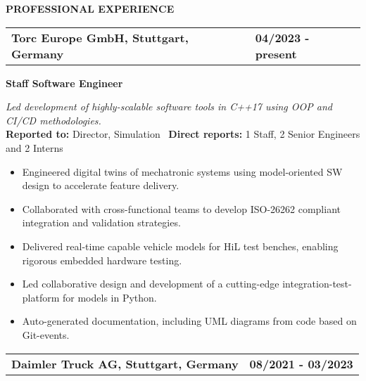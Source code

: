 \documentclass[a4paper,10pt]{article}
\begin{document}
\vspace{0.1cm}
\noindent{\rule{\linewidth}{1.4pt}}
\textbf{PROFESSIONAL EXPERIENCE}

\vspace{-0.1cm}
\noindent{\rule{\linewidth}{0.01cm}}

\noindent
\begin{tabular}{ @{\hskip 0pt}m{} >{\raggedleft\arraybackslash}p{} }
    \noindent\textbf{Torc Europe GmbH, Stuttgart, Germany} & \textbf{04/2023 - present}
\end{tabular}

\noindent
\colorbox{gray!40}{%
    \parbox{0.99\textwidth}{%
        \textcolor{highlightcolor}{\textbf{Staff Software Engineer}}
    }%
}

\vspace{0.2cm}
\noindent
\textit{Led development of highly-scalable software tools in C++17 using OOP and CI/CD methodologies.}\\

\vspace{-0.3cm}
\noindent
\textbf{Reported to:} Director, Simulation \, \textbf{Direct reports:} 1 Staff, 2 Senior Engineers and 2 Interns \, 
\begin{itemize}[itemsep=0pt, topsep=5pt]
  \item Engineered digital twins of mechatronic systems using model-oriented SW design to accelerate feature delivery. 
  \item Collaborated with cross-functional teams to
      develop ISO-26262 compliant integration and validation strategies.
  \item Delivered real-time capable vehicle models for HiL test benches, enabling rigorous embedded hardware testing.
  \item Led collaborative design and development of a cutting-edge integration-test-platform for models in Python.
  \item Auto-generated documentation, including UML diagrams from code based on Git-events.
\end{itemize}

\vspace{0.3cm}
\noindent
\begin{tabular}{ @{\hskip 0pt}m{} >{\raggedleft\arraybackslash}p{} }
    \noindent\textbf{Daimler Truck AG, Stuttgart, Germany} & \textbf{08/2021 - 03/2023}
\end{tabular}
\end{document}
